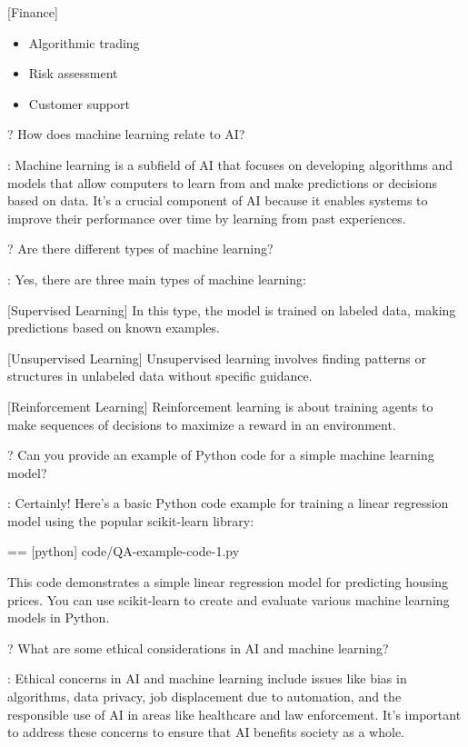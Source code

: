   [Finance]
  \begin{itemize}
    \item Algorithmic trading
    \item Risk assessment
    \item Customer support
  \end{itemize}

?
  How does machine learning relate to AI?

:
  Machine learning is a subfield of AI that focuses on developing algorithms and models that allow computers to learn from and make predictions or decisions based on data. It's a crucial component of AI because it enables systems to improve their performance over time by learning from past experiences.

?
  Are there different types of machine learning?

:
  Yes, there are three main types of machine learning:

  [Supervised Learning]
  In this type, the model is trained on labeled data, making predictions based on known examples.

  [Unsupervised Learning]
  Unsupervised learning involves finding patterns or structures in unlabeled data without specific guidance.

  [Reinforcement Learning]
  Reinforcement learning is about training agents to make sequences of decisions to maximize a reward in an environment.

?
  Can you provide an example of Python code for a simple machine learning model?

:
  Certainly! Here's a basic Python code example for training a linear regression model using the popular scikit-learn library:

  == [python] {code/QA-example-code-1.py}

  This code demonstrates a simple linear regression model for predicting housing prices. You can use scikit-learn to create and evaluate various machine learning models in Python.

?
  What are some ethical considerations in AI and machine learning?

:
  Ethical concerns in AI and machine learning include issues like bias in algorithms, data privacy, job displacement due to automation, and the responsible use of AI in areas like healthcare and law enforcement. It's important to address these concerns to ensure that AI benefits society as a whole.
